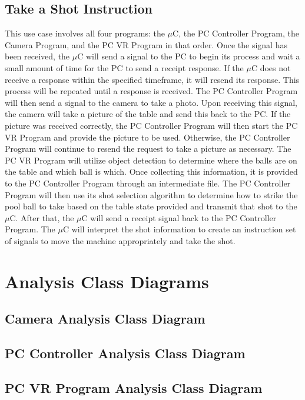 \documentclass[titlepage]{article}
\begin{document}
\subsection{Take a Shot Instruction}
This use case involves all four programs: the $\mu$C, the PC Controller Program, the Camera Program, and the PC VR Program in that order. Once the signal has been received, the $\mu$C will send a signal to the PC to begin its process and wait a small amount of time for the PC to send a receipt response. If the $\mu$C does not receive a response within the specified timeframe, it will resend its response. This process will be repeated until a response is received. The PC Controller Program will then send a signal to the camera to take a photo. Upon receiving this signal, the camera will take a picture of the table and send this back to the PC. If the picture was received correctly, the PC Controller Program will then start the PC VR Program and provide the picture to be used. Otherwise, the PC Controller Program will continue to resend the request to take a picture as necessary. The PC VR Program will utilize object detection to determine where the balls are on the table and which ball is which. Once collecting this information, it is provided to the PC Controller Program through an intermediate file. The PC Controller Program will then use its shot selection algorithm to determine how to strike the pool ball to take based on the table state provided and transmit that shot to the $\mu$C. After that, the $\mu$C will send a receipt signal back to the PC Controller Program. The $\mu$C will interpret the shot information to create an instruction set of signals to move the machine appropriately and take the shot.


\section{Analysis Class Diagrams}
\subsection{Camera Analysis Class Diagram}
\subsection{PC Controller Analysis Class Diagram}
\subsection{PC VR Program Analysis Class Diagram}
\end{document}
